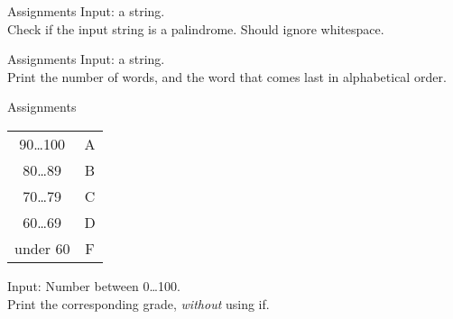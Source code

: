 \documentclass{beamer}
\begin{document}
\begin{frame}{Assignments}
  Input: a string. \\
  Check if the input string is a palindrome. Should ignore whitespace.
\end{frame}

\begin{frame}{Assignments}
  Input: a string. \\
  Print the number of words, and the word that comes last in
  alphabetical order.
\end{frame}

\begin{frame}{Assignments}
    \begin{tabular}{c c}
      90\ldots100 & A \\
      80\ldots89 & B \\
      70\ldots79 & C \\
      60\ldots69 & D \\
      under 60 & F
    \end{tabular}
    \bigskip

    Input: Number between 0\ldots100.\\
    Print the corresponding grade, \textit{without} using if.
\end{frame}
\end{document}
